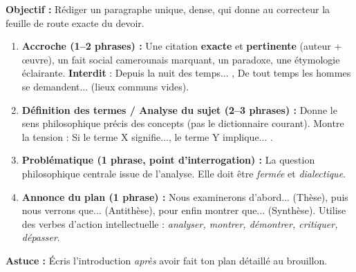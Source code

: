 \documentclass[11pt]{article}
\newcommand{\cle}[1]{{\popxbold\color{popdark}#1}}
\begin{document}
\begin{methode}
    \textbf{Objectif :} Rédiger un paragraphe unique, dense, qui donne au correcteur la \cle{feuille de route} exacte du devoir.
    \begin{enumerate}
        \item \textbf{Accroche (1--2 phrases) :} Une citation \textbf{exacte} et \textbf{pertinente} (auteur + œuvre), un fait social camerounais marquant, un paradoxe, une étymologie éclairante. \textbf{Interdit} : \guillemotleft Depuis la nuit des temps... \guillemotright, \guillemotleft De tout temps les hommes se demandent... \guillemotright (lieux communs vides).
        \item \textbf{Définition des termes / Analyse du sujet (2--3 phrases) :} Donne le sens philosophique précis des concepts (pas le dictionnaire courant). Montre la tension : \guillemotleft Si le terme X signifie..., le terme Y implique... \guillemotright.
        \item \textbf{Problématique (1 phrase, point d'interrogation) :} La question philosophique centrale issue de l'analyse. Elle doit être \emph{fermée} et \emph{dialectique}.
        \item \textbf{Annonce du plan (1 phrase) :} \guillemotleft Nous examinerons d'abord... (Thèse), puis nous verrons que... (Antithèse), pour enfin montrer que... (Synthèse). \guillemotright Utilise des verbes d'action intellectuelle : \emph{analyser, montrer, démontrer, critiquer, dépasser}.
    \end{enumerate}
    \textbf{Astuce :} Écris l'introduction \emph{après} avoir fait ton plan détaillé au brouillon.
\end{methode}
\end{document}
